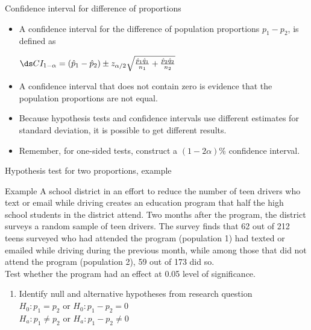 \documentclass[xcolor=table, handout]{beamer}
\begin{document}
\begin{frame}{Confidence interval for difference of proportions}
\begin{block}{}
\large
\begin{itemize}
\item A confidence interval for the difference of population proportions $p_1 - p_2$, is defined as\\
\smallskip
{\centering $\ds CI_{1-\alpha} = (\hat p_1 - \hat p_2) \pm z_{\alpha/2} \sqrt{\frac {\hat p_1 \hat q_1}{n_1} + \frac {\hat p_2 \hat q_2}{n_2}}$ \par}
\smallskip
\pause\item A confidence interval that does not contain zero is evidence that the population proportions are not equal.

\pause\item Because hypothesis tests and confidence intervals use different estimates for standard deviation, it is possible to get different results.

\pause\item Remember, for one-sided tests, construct a $(1-2\alpha)$\% confidence interval.
\end{itemize}
\end{block}
\end{frame}




\begin{frame}{Hypothesis test for two proportions, example}
\begin{exampleblock}{Example}
\large
A school district in an effort to reduce the number of teen drivers who text or email while driving creates an education program that half the high school students in the district attend. Two months after the program, the district surveys a random sample of teen drivers. The survey finds that 62 out of 212 teens surveyed who had attended the program (population 1) had texted or emailed while driving during the previous month, while among those that did not attend the program (population 2), 59 out of 173 did so.\\
\medskip
Test whether the program had an effect at 0.05 level of significance.
\begin{enumerate}
\pause\item Identify null and alternative hypotheses from research question\\
\pause$H_0: p_1 = p_2$ or $H_0: p_1 - p_2 = 0$\\
$H_a: p_1 \ne p_2$ or $H_a: p_1 - p_2 \ne 0$\\
\end{enumerate}
\end{exampleblock}
\end{frame}
\end{document}
